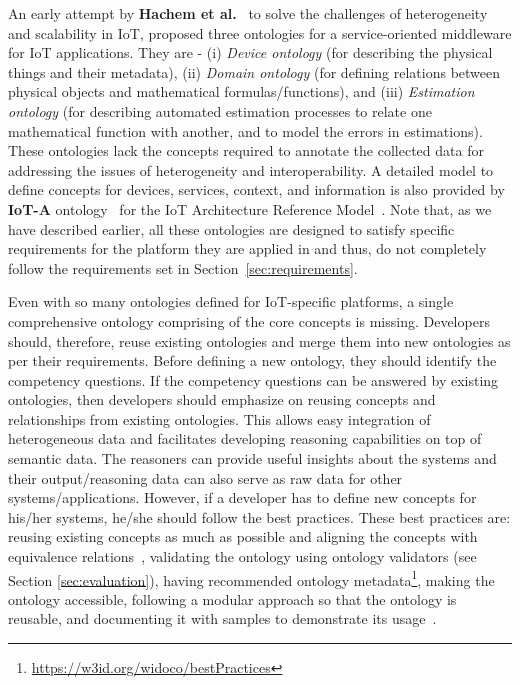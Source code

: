 \documentclass{elsart}  %
\begin{document}
An early attempt by \textbf{Hachem et al.}~\cite{hachem2011ontologies} to solve the challenges of heterogeneity and scalability in IoT, proposed three ontologies for a service-oriented middleware for IoT applications. They are - (i) \textit{Device ontology} (for describing the physical things and their metadata), (ii) \textit{Domain ontology} (for defining relations between physical objects and mathematical formulas/functions), and (iii) \textit{Estimation ontology} (for describing automated estimation processes to relate one mathematical function with another, and to model the errors in estimations). These ontologies lack the concepts required to annotate the collected data for addressing the issues of heterogeneity and interoperability. A detailed model to define concepts for devices, services, context, and information is also provided by \textbf{IoT-A} ontology~\cite{bauer2013iot} for the IoT Architecture Reference Model~\cite{bassi2013enabling}. Note that, as we have described earlier, all these ontologies are designed to satisfy specific requirements for the platform they are applied in and thus, do not completely follow the requirements set in Section~\ref{sec:requirements}.
\par
Even with so many ontologies defined for IoT-specific platforms, a single comprehensive ontology comprising of the core concepts is missing. Developers should, therefore, reuse existing ontologies and merge them into new ontologies as per their requirements. Before defining a new ontology, they should identify the competency questions. If the competency questions can be answered by existing ontologies, then developers should emphasize on reusing concepts and relationships from existing ontologies. This allows easy integration of heterogeneous data and facilitates developing reasoning capabilities on top of semantic data. The reasoners can provide useful insights about the systems and their output/reasoning data can also serve as raw data for other systems/applications. However, if a developer has to define new concepts for his/her systems, he/she should follow the best practices. These best practices are: reusing existing concepts as much as possible and aligning the concepts with equivalence relations~\cite{Suarez2010}, validating the ontology using ontology validators (see Section \ref{sec:evaluation}), having recommended ontology metadata\footnote{\url{https://w3id.org/widoco/bestPractices}}, making the ontology accessible, following a modular approach so that the ontology is reusable, and documenting it with samples to demonstrate its usage~\cite{gyrard2015semantic}.
\end{document}
